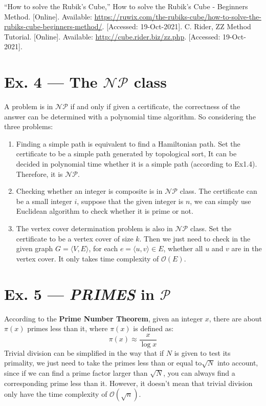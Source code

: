 \documentclass[12pt, a4paper]{article}
\begin{document}
\begin{thebibliography}{}
     “How to solve the Rubik's Cube,” How to solve the Rubik's Cube - Beginners Method. [Online]. 
    Available: \url{https://ruwix.com/the-rubiks-cube/how-to-solve-the-rubiks-cube-beginners-method/}. [Accessed: 19-Oct-2021].
     C. Rider, ZZ Method Tutorial. [Online]. Available: \url{http://cube.rider.biz/zz.php}. [Accessed: 19-Oct-2021]. 
\end{thebibliography}

\section*{Ex. 4 --- The $\mathcal{NP}$ class}
A problem is in $\mathcal{NP}$ if and only if given a certificate, the correctness of the answer can be determined with a polynomial time algorithm.
So considering the three problems:
\begin{enumerate}
    \item Finding a simple path is equivalent to find a Hamiltonian path. Set the certificate to be a simple path generated by topological sort, 
          It can be decided in polynomial time whether it is a simple path (according to Ex1.4). Therefore, it is $\mathcal{NP}$.
    \item Checking whether an integer is composite is in $\mathcal{NP}$ class. The certificate can be a small integer $i$, 
          suppose that the given integer is $n$, we can simply use Euclidean algorithm to check whether it is prime or not. 
    \item The vertex cover determination problem is also in $\mathcal{NP}$ class. Set the certificate to be a vertex cover of size $k$. 
          Then we just need to check in the given graph $G=\langle V, E\rangle$, for each $e = \langle u, v\rangle \in E$, 
          whether all $u$ and $v$ are in the vertex cover. It only takes time complexity of $\mathcal{O}(E)$.
\end{enumerate}

\section*{Ex. 5 --- \textit{PRIMES} in $\mathcal{P}$}
According to the \textbf{Prime Number Theorem}, given an integer $x$, there are about $\pi(x)$ primes less than it, where $\pi(x)$ is defined as:
$$\pi(x) \approx \frac{x}{\log x}$$
Trivial division can be simplified in the way that if $N$ is given to test its primality, 
we just need to take the primes less than or equal to$\sqrt{N}$ into account, since if we can find a prime factor larger than $\sqrt{N}$, 
you can always find a corresponding prime less than it. However, it doesn't mean that trivial division only have the time complexity of $\mathcal{O}(\sqrt{n})$. 
\end{document}
